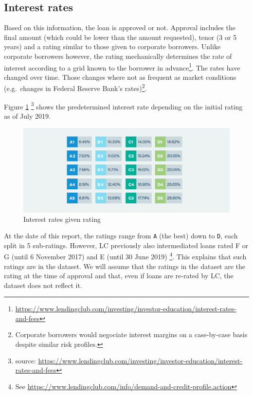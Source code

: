 \documentclass[11pt,]{report}
\let\rmarkdownfootnote\footnote%
\def\footnote{\protect\rmarkdownfootnote}
\begin{document}
\hypertarget{interest-rates}{%
\subsection{Interest rates}\label{interest-rates}}

Based on this information, the loan is approved or not. Approval includes the final amount (which could be lower than the amount requested), tenor (3 or 5 years) and a rating similar to those given to corporate borrowers. Unlike corporate borrowers however, the rating mechanically determines the rate of interest according to a grid known to the borrower in advance\footnote{\url{https://www.lendingclub.com/investing/investor-education/interest-rates-and-fees}}. The rates have changed over time. Those changes where not as frequent as market conditions (e.g.~changes in Federal Reserve Bank's rates)\footnote{Corporate borrowers would negociate interest margins on a case-by-case basis despite similar risk profiles.}.

Figure \ref{fig:interest-rate-table} \footnote{source: \url{https://www.lendingclub.com/investing/investor-education/interest-rates-and-fees}} shows the predetermined interest rate depending on the initial rating as of July 2019.

\begin{figure}

{\centering \includegraphics[width=0.7\linewidth]{images/interest-rates-jul2019} 

}

\caption{Interest rates given rating}\label{fig:interest-rate-table}
\end{figure}

At the date of this report, the ratings range from \texttt{A} (the best) down to \texttt{D}, each split in 5 sub-ratings. However, LC previously also intermediated loans rated F or G (until 6 November 2017) and E (until 30 June 2019) \footnote{See \url{https://www.lendingclub.com/info/demand-and-credit-profile.action}}. This explains that such ratings are in the dataset. We will assume that the ratings in the dataset are the rating at the time of approval and that, even if loans are re-rated by LC, the dataset does not reflect it.
\end{document}
